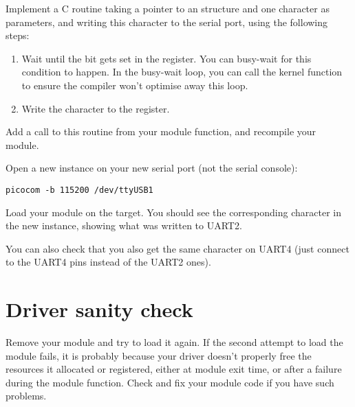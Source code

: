 Implement a C routine taking a pointer to an 
structure and one character as parameters, and writing
this character to the serial port, using the following steps:

\begin{enumerate}
\item Wait until the  bit gets set in the
   register.  You can busy-wait for this condition to happen.
  In the busy-wait loop, you can call the  kernel function
  to ensure the compiler won't optimise away this loop.
\item Write the character to the  register.
\end{enumerate}

Add a call to this routine from your module  function,
and recompile your module.

Open a new  instance on your new serial port (not the
serial console):

\begin{verbatim}
picocom -b 115200 /dev/ttyUSB1
\end{verbatim}

Load your module on the target. You should see the
corresponding character in the new  instance,
showing what was written to UART2.

You can also check that you also get the same character on UART4
(just connect to the UART4 pins instead of the UART2 ones).

\section{Driver sanity check}

Remove your module and try to load it again. If the second attempt to
load the module fails, it is probably because your driver doesn't
properly free the resources it allocated or registered, either at module
exit time, or after a failure during the module  function. Check
and fix your module code if you have such problems.
